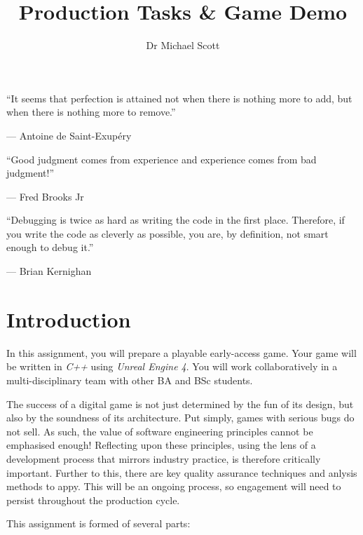 \documentclass{../../fal_assignment}
\title{Production Tasks \& Game Demo}
\author{Dr Michael Scott}
\begin{document}
\maketitle

\begin{marginquote}
    ``It seems that perfection is attained not when there is nothing more to add,
        but when there is nothing more to remove.''
    
    --- Antoine de Saint-Exup\'ery
    
    \marginquoterule
    
    ``Good judgment comes from experience and experience comes from bad judgment!''
    
    --- Fred Brooks Jr
    
    \marginquoterule
    
    ``Debugging is twice as hard as writing the code in the first place.
     Therefore, if you write the code as cleverly as possible, you are, by definition, not smart enough to debug it.'' 
 
         --- Brian Kernighan
     
\end{marginquote}

\section*{Introduction}

In this assignment, you will prepare a playable early-access game. Your game will be written in \textit{C++} using \textit{Unreal Engine 4}. You will work collaboratively in a multi-disciplinary team with other BA and BSc students.

The success of a digital game is not just determined by the fun of its design, but also by the soundness of its architecture. Put simply, games with serious bugs do not sell. As such, the value of software engineering principles cannot be emphasised enough! Reflecting upon these principles, using the lens of a development process that mirrors industry practice, is therefore critically important. Further to this, there are key quality assurance techniques and anlysis methods to appy. This will be an ongoing process, so engagement will need to persist throughout the production cycle.

This assignment is formed of several parts:
\end{document}
